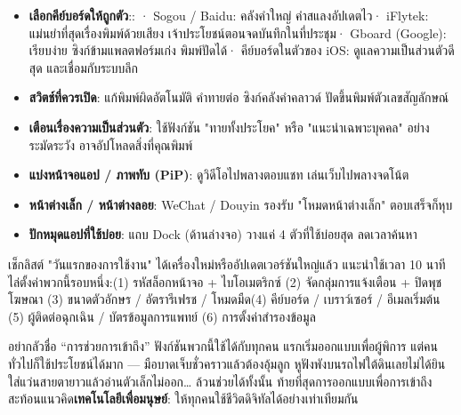 
\begin{itemize}
  \item \textbf{เลือกคีย์บอร์ดให้ถูกตัว}:\newline : · Sogou / Baidu: คลังคำใหญ่ คำสแลงอัปเดตไว\newline · iFlytek: แม่นยำที่สุดเรื่องพิมพ์ด้วยเสียง เจ้าประโยชน์ตอนจดบันทึกในที่ประชุม\newline · Gboard (Google): เรียบง่าย ซิงก์ข้ามแพลตฟอร์มเก่ง พิมพ์ปัดได้\newline · คีย์บอร์ดในตัวของ iOS: ดูแลความเป็นส่วนตัวดีสุด และเชื่อมกับระบบลึก
  \item \textbf{สวิตช์ที่ควรเปิด}: แก้พิมพ์ผิดอัตโนมัติ คำทายต่อ ซิงก์คลังคำคลาวด์ ปัดขึ้นพิมพ์ตัวเลขสัญลักษณ์
  \item \textbf{เตือนเรื่องความเป็นส่วนตัว}: ใช้ฟังก์ชัน "ทายทั้งประโยค" หรือ "แนะนำเฉพาะบุคคล" อย่างระมัดระวัง อาจอัปโหลดสิ่งที่คุณพิมพ์
\end{itemize}


\begin{itemize}
  \item \textbf{แบ่งหน้าจอแอป / ภาพทับ (PiP)}: ดูวิดีโอไปพลางตอบแชท เล่นเว็บไปพลางจดโน้ต
  \item \textbf{หน้าต่างเล็ก / หน้าต่างลอย}: WeChat / Douyin รองรับ "โหมดหน้าต่างเล็ก" ตอบเสร็จก็หุบ
  \item \textbf{ปักหมุดแอปที่ใช้บ่อย}: แถบ Dock (ด้านล่างจอ) วางแค่ 4 ตัวที่ใช้บ่อยสุด ลดเวลาค้นหา
\end{itemize}

\begin{tcbinfo}{เช็กลิสต์ "วันแรกของการใช้งาน"}
ได้เครื่องใหม่หรืออัปเดตเวอร์ชันใหญ่แล้ว แนะนำใช้เวลา 10 นาทีไล่ตั้งค่าพวกนี้รอบหนึ่ง:\newline (1) รหัสล็อกหน้าจอ + ไบโอเมตริกซ์ (2) จัดกลุ่มการแจ้งเตือน + ปิดพุชโฆษณา (3) ขนาดตัวอักษร / อัตรารีเฟรช / โหมดมืด\newline (4) คีย์บอร์ด / เบราว์เซอร์ / อีเมลเริ่มต้น (5) ผู้ติดต่อฉุกเฉิน / บัตรข้อมูลการแพทย์ (6) การตั้งค่าสำรองข้อมูล

\end{tcbinfo}


อย่ากลัวชื่อ “การช่วยการเข้าถึง” ฟังก์ชันพวกนี้ใช้ได้กับทุกคน แรกเริ่มออกแบบเพื่อผู้พิการ แต่คนทั่วไปก็ใช้ประโยชน์ได้มาก — มือบาดเจ็บชั่วคราวแล้วต้องอุ้มลูก หูฟังพังบนรถไฟใต้ดินเลยไม่ได้ยิน ใส่แว่นสายตายาวแล้วอ่านตัวเล็กไม่ออก… ล้วนช่วยได้ทั้งนั้น ท้ายที่สุดการออกแบบเพื่อการเข้าถึงสะท้อนแนวคิด\textbf{เทคโนโลยีเพื่อมนุษย์}: ให้ทุกคนใช้ชีวิตดิจิทัลได้อย่างเท่าเทียมกัน

